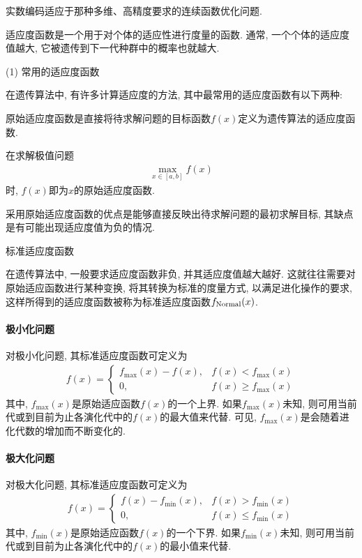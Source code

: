 实数编码适应于那种多维、高精度要求的连续函数优化问题.

适应度函数是一个用于对个体的适应性进行度量的函数. 通常, 一个个体的适应度值越大, 它被遗传到下一代种群中的概率也就越大.

(1) 常用的适应度函数

在遗传算法中, 有许多计算适应度的方法, 其中最常用的适应度函数有以下两种:

 原始适应度函数是直接将待求解问题的目标函数$f(x)$定义为遗传算法的适应度函数.

\begin{example}
    在求解极值问题
\begin{align}
 \max _{x \in[a, b]} f(x)
\end{align}
时, $f(x)$即为$x$的原始适应度函数.
\end{example}

采用原始适应度函数的优点是能够直接反映出待求解问题的最初求解目标, 其缺点是有可能出现适应度值为负的情况.

 标准适应度函数

在遗传算法中, 一般要求适应度函数非负, 并其适应度值越大越好. 这就往往需要对原始适应函数进行某种变换, 将其转换为标准的度量方式, 以满足进化操作的要求, 这样所得到的适应度函数被称为标准适应度函数$f_{\textup{Normal}}(x)$.
\paragraph{极小化问题}
对极小化问题, 其标准适应度函数可定义为
\begin{align}
f(x)=
\left\{\begin{array}{ll}
{f_{\max }(x)-f(x)}, &f(x)<f_{\max}(x) \\
{0}, & f(x)\geq f_{\max }(x)
\end{array}
\right.
\end{align}
其中, $f_{\max}(x)$是原始适应函数$f(x)$的一个上界. 如果$f_{\max}(x)$未知, 则可用当前代或到目前为止各演化代中的$f(x)$的最大值来代替. 可见, $f_{\max}(x)$是会随着进化代数的增加而不断变化的.
\paragraph{极大化问题}
对极大化问题, 其标准适应度函数可定义为
\begin{align}
  f(x)=\left\{
  \begin{array}{ll}
  f(x)-f_{\min }(x), &f(x)>f_{\min}(x)\\
 0, & f(x)\leq f_{\min}(x)
  \end{array}
  \right.
\end{align}
其中, $f_{\min}(x)$是原始适应函数$f(x)$的一个下界. 如果$f_{\min}(x)$未知, 则可用当前代或到目前为止各演化代中的$f(x)$的最小值来代替.

